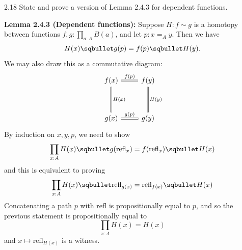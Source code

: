 \documentclass[14pt]{extarticle}
\newcommand{\0}{{\mathbf 0}}
\newcommand{\1}{{\mathbf 1}}
\newcommand{\2}{{\mathbf 2}}
\newcommand{\mt}{\mapsto}
\newcommand{\refl}{\mathrm{refl}}
\begin{document}
\begin{prob}{2.18}{}
State and prove a version of Lemma 2.4.3 for dependent functions.
\end{prob}
\textbf{Lemma 2.4.3 (Dependent functions):} Suppose $H : f \sim g$ is a homotopy between functions $f,g : \prod_{a:A}B(a)$, and let $p : x =_A y$.
Then we have \[H(x) \sqbullet g(p) = f(p) \sqbullet H(y).\] We may also draw this as a commutative diagram:
\[
\begin{tikzcd}
f(x) \arrow[r, "f(p)", equal] \arrow[dd, "H(x)", equal] & f(y) \arrow[dd, "H(y)", equal] \\
& \\
g(x) \arrow[r, "g(p)", equal] & g(y)
\end{tikzcd}
\]
By induction on $x,y,p$, we need to show
\[\prod_{x:A}H(x) \sqbullet g(\refl_x) = f(\refl_x) \sqbullet H(x)\]
and this is equivalent to proving 
\[\prod_{x:A}H(x) \sqbullet \refl_{g(x)} = \refl_{f(x)} \sqbullet H(x)\]
Concatenating a path $p$ with $\refl$ is propositionally equal to $p$, and so the previous statement is propositionally equal to
\[\prod_{x:A}H(x) = H(x)\] and $x \mt \refl_{H(x)}$ is a witness.
\end{document}
